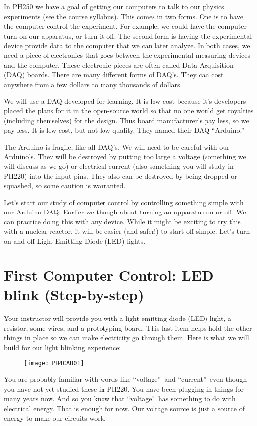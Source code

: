In PH250 we have a goal of getting our computers to talk to our physics
experiments (see the course syllabus). This comes in two forms. One is to
have the computer control the experiment. For example, we could have the
computer turn on our apparatus, or turn it off. The second form is having
the experimental device provide data to the computer that we can later
analyze. In both cases, we need a piece of electronics that goes between the
experimental measuring devices and the computer. These electronic pieces are
often called Data Acquisition (DAQ) boards. There are many different forms
of DAQ's. They can cost anywhere from a few dollars to many thousands of
dollars.

We will use a DAQ developed for learning. It is low cost because it's
developers placed the plans for it in the open-source world so that no one
would get royalties (including themselves) for the design. Thus board
manufacturer's pay less, so we pay less. It is low cost, but not low
quality. They named their DAQ \textquotedblleft Arduino.\textquotedblright\ 

The Arduino is fragile, like all DAQ's. We will need to be careful with our
Arduino's. They will be destroyed by putting too large a voltage (something
we will discuss as we go) or electrical current (also something you will
study in PH220) into the input pins. They also can be destroyed by being
dropped or squashed, so some caution is warranted.

Let's start our study of computer control by controlling something simple
with our Arduino DAQ. Earlier we though about turning an apparatus on or
off. We can practice doing this with any device. While it might be exciting
to try this with a nuclear reactor, it will be easier (and safer!) to start
off simple. Let's turn on and off Light Emitting Diode (LED) lights.

\section{First Computer Control: LED blink (Step-by-step)}

Your instructor will provide you with a light emitting diode (LED) light, a
resistor, some wires, and a prototyping board. This last item helps hold the
other things in place so we can make electricity go through them. Here is
what we will build for our light blinking experience:

\begin{figure}[h!]
\texttt{[image: PH4CAU01]}
\end{figure}You are probably familiar with
words like \textquotedblleft voltage\textquotedblright\ and
\textquotedblleft current\textquotedblright\ even though you have not yet
studied these in PH220. You have been plugging in things for many years now.
And so you know that \textquotedblleft voltage\textquotedblright\ has
something to do with electrical energy. That is enough for now. Our voltage
source is just a source of energy to make our circuits work.


